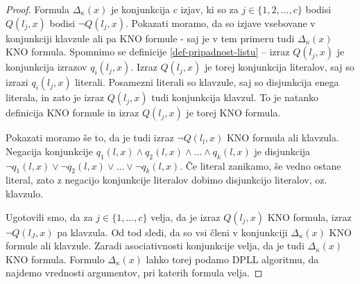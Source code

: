 \documentclass[12pt,a4paper,twoside]{article}
\theoremstyle{definition} %
\theoremstyle{plain} %
\numberwithin{equation}{section}  %
\begin{document}
\begin{proof}
	Formula $\Delta_{\kappa}(x)$ je konjunkcija $c$ izjav, ki so za $j \in \{1,2,\ldots,c\}$ bodisi $Q(l_j,x)$ bodisi $\lnot Q(l_j,x)$.
	Pokazati moramo, da so izjave vsebovane v konjunkciji klavzule ali pa KNO formule - saj je v tem primeru tudi $\Delta_{\kappa}(x)$ KNO formula.
	Spomnimo se definicije \ref{def-pripadnost-listu} -- izraz $Q(l_j,x)$ je konjunkcija izrazov $q_i(l_j,x)$.
	Izraz $Q(l_j,x)$ je torej konjunkcija literalov, saj so izrazi $q_i(l_j,x)$ literali.
	Posamezni literali so klavzule, saj so disjunkcija enega literala, in zato je izraz $Q(l_j,x)$ tudi konjunkcija klavzul.
	To je natanko definicija KNO formule in izraz $Q(l_j,x)$ je torej KNO formula.

	Pokazati moramo še to, da je tudi izraz $\lnot Q(l_l,x)$ KNO formula ali klavzula.
	Negacija konjunkcije $q_1(l,x) \land q_2(l,x) \land \ldots \land q_k(l,x)$ je disjunkcija $\lnot q_1(l,x) \lor \lnot q_2(l,x) \lor \ldots \lor \lnot q_k(l,x)$.
	Če literal zanikamo, še vedno ostane literal, zato z negacijo konjunkcije literalov dobimo disjunkcijo literalov, oz. klavzulo.

	Ugotovili smo, da za $j \in \{1,\ldots,c\}$ velja, da je izraz $Q(l_j,x)$ KNO formula, izraz $\lnot Q(l_J,x)$ pa klavzula.
	Od tod sledi, da so vsi členi v konjunkciji $\Delta_{\kappa}(x)$ KNO formule ali klavzule.
	Zaradi asociativnosti konjunkcije velja, da je tudi $\Delta_{\kappa}(x)$ KNO formula.
	Formulo $\Delta_{\kappa}(x)$ lahko torej podamo DPLL algoritmu, da najdemo vrednosti argumentov, pri katerih formula velja.
\end{proof}

\end{document}
